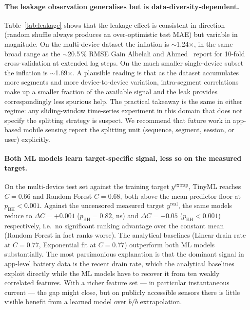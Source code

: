 \documentclass[conference]{IEEEtran}
\begin{document}
\paragraph{The leakage observation generalises but is
data-diversity-dependent.}
Table~\ref{tab:leakage} shows that the leakage effect is consistent
in direction (random shuffle always produces an over-optimistic test
MAE) but variable in magnitude. On the multi-device dataset the
inflation is $\sim$1.24$\times$, in the same broad range as the
$\sim$20.5\,\% RMSE Gain Albelali and
Ahmed~\cite{albelali2025hidden} report for 10-fold cross-validation
at extended lag steps. On the much smaller single-device subset
the inflation is $\sim$1.69$\times$. A plausible reading is that as
the dataset accumulates more segments and more device-to-device
variation, intra-segment correlations make up a smaller fraction of
the available signal and the leak provides correspondingly less
spurious help. The practical takeaway is the same in either regime:
any sliding-window time-series experiment in this domain that does
not specify the splitting strategy is suspect. We recommend that
future work in app-based mobile sensing report the splitting unit
(sequence, segment, session, or user) explicitly.

\paragraph{Both ML models learn target-specific signal, less so on the measured target.}
On the multi-device test set against the training target $y^{\text{extrap}}$,
TinyML reaches $C{=}0.66$ and Random Forest $C{=}0.68$, both above the
mean-predictor floor at $p_{\text{BH}} < 0.001$. Against the
uncensored measured target $y^{\text{real}}$, the same models reduce
to $\Delta C{=}{+}0.001$ ($p_{\text{BH}}{=}0.82$, ns) and
$\Delta C{=}{-}0.05$ ($p_{\text{BH}}{<}0.001$) respectively,
i.e.\ no significant ranking advantage over the constant mean
(Random Forest in fact ranks worse). The analytical baselines
(Linear drain rate at $C{=}0.77$, Exponential fit at $C{=}0.77$)
outperform both ML models substantially.
The most parsimonious explanation is that the dominant signal in
app-level battery data is the recent drain rate, which the analytical
baselines exploit directly while the ML models have to recover it from
ten weakly correlated features. With a richer feature set --- in
particular instantaneous current --- the gap might close, but on
publicly accessible sensors there is little visible benefit from a
learned model over $b/\dot b$ extrapolation.
\end{document}
